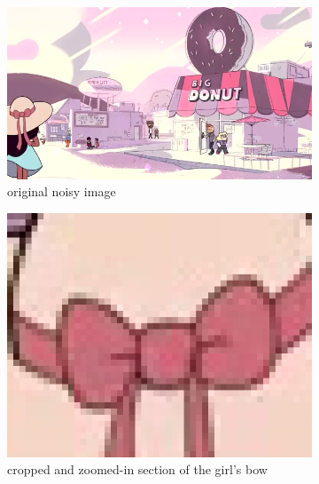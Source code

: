 \documentclass[10pt,twocolumn,letterpaper]{article}
\begin{document}
\begin{figure}
\begin{subfigure}{\textwidth}
  \centering
  \includegraphics[width=\linewidth]{colorFrame000300.jpg}
  \caption{original noisy image}
  \label{fig:frame300}
\end{subfigure}
\begin{subfigure}{.5\textwidth}
  \centering
  \includegraphics[width=\linewidth]{bow_large.png}
  \caption{cropped and zoomed-in section of the girl's bow}
  \label{fig:bow}
\end{subfigure}
\begin{subfigure}{.5\textwidth}
  \centering

\end{subfigure}
\end{figure}
\end{document}
